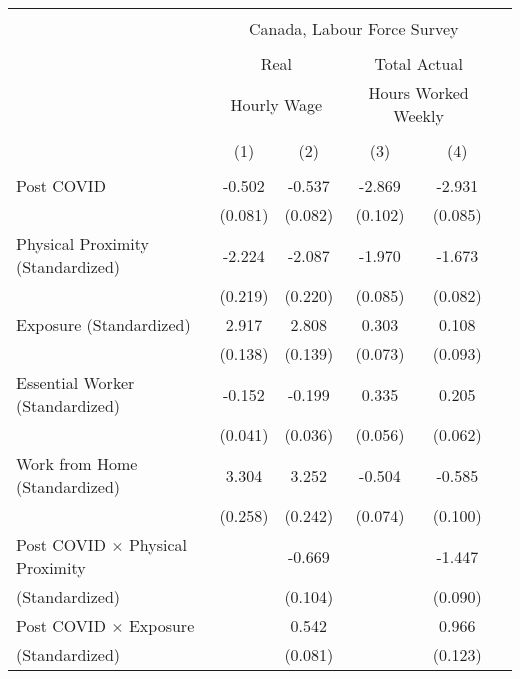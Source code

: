 \begin{tabular*}{\textwidth}{ @{\extracolsep{\fill}}l*{5}{c}}
\hline\hline
\\
 &\multicolumn{4}{c}{Canada, Labour Force Survey} \\
\cline{2-5} \\
&\multicolumn{2}{c}{Real} &\multicolumn{2}{c}{Total Actual} \\
&\multicolumn{2}{c}{Hourly Wage} &\multicolumn{2}{c}{Hours Worked Weekly} \\
\cline{2-3} \cline{4-5} \\
                                             &\multicolumn{1}{c}{(1)}     &\multicolumn{1}{c}{(2)}     &\multicolumn{1}{c}{(3)}     &\multicolumn{1}{c}{(4)}\\
\hline
\\
Post COVID                                   &-0.502     &-0.537     &-2.869     &-2.931\\
                                             &(0.081)     &(0.082)     &(0.102)     &(0.085)\\[0.5em]
%
Physical Proximity (Standardized)            &-2.224     &-2.087     &-1.970     &-1.673\\
                                             &(0.219)     &(0.220)     &(0.085)     &(0.082)\\[0.5em]
%
Exposure (Standardized)                      &2.917     &2.808     &0.303     &0.108\\
                                             &(0.138)     &(0.139)     &(0.073)     &(0.093)\\[0.5em]
%
Essential Worker (Standardized)              &-0.152     &-0.199     &0.335     &0.205\\
                                             &(0.041)     &(0.036)     &(0.056)     &(0.062)\\[0.5em]
%
Work from Home (Standardized)                &3.304     &3.252     &-0.504     &-0.585\\
                                             &(0.258)     &(0.242)     &(0.074)     &(0.100)\\[0.5em]
%
Post COVID $\times$ Physical Proximity       &         &-0.669     &         &-1.447\\
(Standardized)                               &         &(0.104)     &         &(0.090)\\[0.5em]
%
Post COVID $\times$ Exposure                 &         &0.542     &         &0.966\\
(Standardized)                               &         &(0.081)     &         &(0.123)\\[0.5em]

\end{tabular*}
